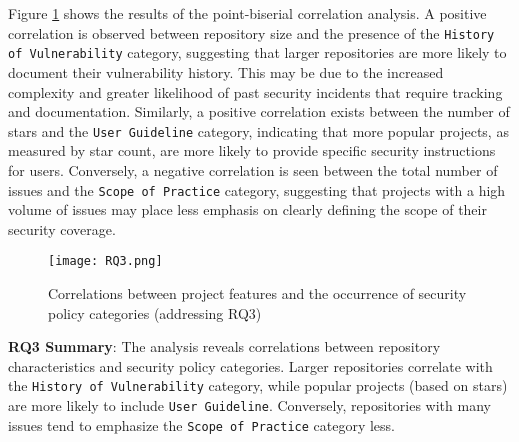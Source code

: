 Figure \ref{fig:RQ3Correlations} shows the results of the point-biserial correlation analysis. A positive correlation is observed between repository size and the presence of the \texttt{History of Vulnerability} category, suggesting that larger repositories are more likely to document their vulnerability history. This may be due to the increased complexity and greater likelihood of past security incidents that require tracking and documentation. Similarly, a positive correlation exists between the number of stars and the \texttt{User Guideline} category, indicating that more popular projects, as measured by star count, are more likely to provide specific security instructions for users. Conversely, a negative correlation is seen between the total number of issues and the \texttt{Scope of Practice} category, suggesting that projects with a high volume of issues may place less emphasis on clearly defining the scope of their security coverage.


\begin{figure}
    \centering
    \texttt{[image: RQ3.png]}
    \captionsetup{justification=centering}
    \caption{Correlations between project features and the occurrence of security policy categories (addressing RQ3)}
    \label{fig:RQ3Correlations}
\end{figure}

\begin{tcolorbox}[] \textbf{RQ3 Summary}: The analysis reveals correlations between repository characteristics and security policy categories. Larger repositories correlate with the \texttt{History of Vulnerability} category, while popular projects (based on stars) are more likely to include \texttt{User Guideline}. Conversely, repositories with many issues tend to emphasize the \texttt{Scope of Practice} category less. \end{tcolorbox}

% 



